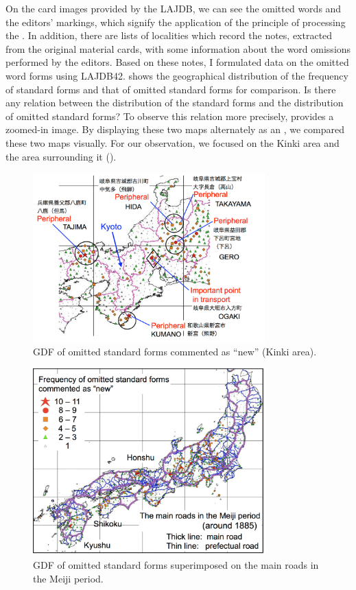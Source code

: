 \documentclass[output=paper]{LSP/langsci}
\begin{document}
On the card images provided by the LAJDB, we can see the omitted words and the editors’ markings, which signify the application of the principle of processing the . In addition, there are lists of localities which record the notes, extracted from the original material cards, with some information about the word omissions performed by the editors. Based on these notes, I formulated data on the omitted word forms using LAJDB42.  shows the geographical distribution of the frequency of standard forms and that of omitted standard forms for comparison. Is there any relation between the distribution of the standard forms and the distribution of omitted standard forms? To observe this relation more precisely,  provides a zoomed-in image. By displaying these two maps alternately as an , we compared these two maps visually. For our observation, we focused on the Kinki area and the area surrounding it (). 

\begin{figure}
\includegraphics[width=0.8\textwidth]{illustrations/kuma_fig18}
\caption{GDF of omitted standard forms commented as “new” (Kinki area).}          
\label{fig:18}
\end{figure}

\begin{figure}
\includegraphics[width=0.8\textwidth]{illustrations/kuma_fig19}
\caption{GDF of omitted standard forms superimposed on the main roads in the Meiji period.}          
\label{fig:19}
\end{figure}             
\end{document}
